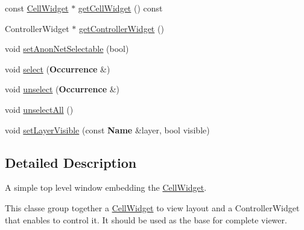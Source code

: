 \begin{DoxyCompactItemize}
\item 
const \hyperlink{classHurricane_1_1CellWidget}{Cell\-Widget} $\ast$ \hyperlink{classHurricane_1_1CellViewer_a2bc07d97d80e3b0a387f8b39ae4b3841}{get\-Cell\-Widget} () const 
\item 
Controller\-Widget $\ast$ \hyperlink{classHurricane_1_1CellViewer_a153855cfa6baa5d50bf0339820c4f145}{get\-Controller\-Widget} ()
\item 
void \hyperlink{classHurricane_1_1CellViewer_a7e4c9aaf405e4895e1527515dff3f067}{set\-Anon\-Net\-Selectable} (bool)
\item 
void \hyperlink{classHurricane_1_1CellViewer_a9f5b6c901e01c53c66cbd0f347cb10be}{select} ({\bf Occurrence} \&)
\item 
void \hyperlink{classHurricane_1_1CellViewer_a48deb92c4f58f987136d116b34f6ccbe}{unselect} ({\bf Occurrence} \&)
\item 
void \hyperlink{classHurricane_1_1CellViewer_adae07707d5d4d7a6fca0ad3c44fb95d2}{unselect\-All} ()
\item 
void \hyperlink{classHurricane_1_1CellViewer_ae628cca8f2c70ff80bba3a0b62e3db14}{set\-Layer\-Visible} (const {\bf Name} \&layer, bool visible)
\end{DoxyCompactItemize}


\subsection{Detailed Description}
A simple top level window embedding the \hyperlink{classHurricane_1_1CellWidget}{Cell\-Widget}. 

This classe group together a \hyperlink{classHurricane_1_1CellWidget}{Cell\-Widget} to view layout and a Controller\-Widget that enables to control it. It should be used as the base for complete viewer. 

